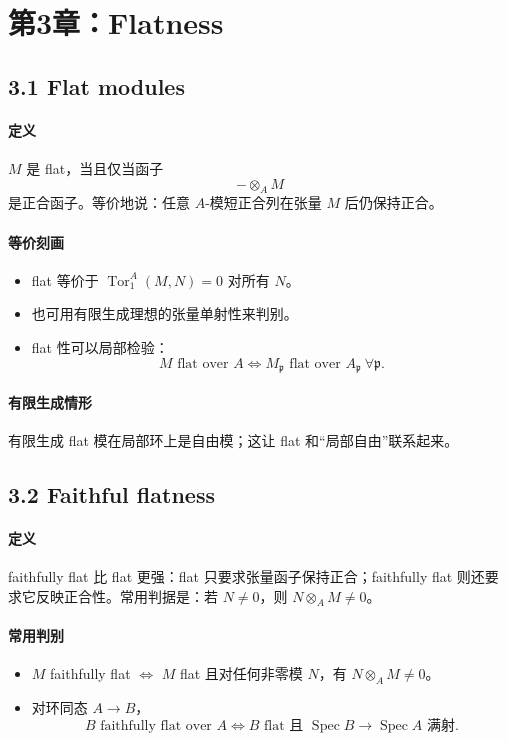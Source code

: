 \documentclass[a4paper]{ctexart}
\begin{document}
\section{第3章：Flatness}

\subsection{3.1 Flat modules}

\paragraph{定义}
\(M\) 是 flat，当且仅当函子
\[
-\otimes_A M
\]
是正合函子。等价地说：任意 \(A\)-模短正合列在张量 \(M\) 后仍保持正合。

\paragraph{等价刻画}
\begin{itemize}
  \item flat 等价于 \(\operatorname{Tor}_1^A(M,N)=0\) 对所有 \(N\)。
  \item 也可用有限生成理想的张量单射性来判别。
  \item flat 性可以局部检验：
  \[
    M \text{ flat over } A
    \Longleftrightarrow
    M_{\mathfrak p} \text{ flat over } A_{\mathfrak p}\ \forall \mathfrak p.
  \]
\end{itemize}

\paragraph{有限生成情形}
有限生成 flat 模在局部环上是自由模；这让 flat 和“局部自由”联系起来。

\subsection{3.2 Faithful flatness}

\paragraph{定义}
faithfully flat 比 flat 更强：flat 只要求张量函子保持正合；faithfully flat 则还要求它反映正合性。常用判据是：若 \(N\neq 0\)，则 \(N\otimes_A M\neq 0\)。

\paragraph{常用判别}
\begin{itemize}
  \item \(M\) faithfully flat
  \(\Longleftrightarrow\)
  \(M\) flat 且对任何非零模 \(N\)，有 \(N\otimes_A M\neq 0\)。
  \item 对环同态 \(A\to B\)，
  \[
    B \text{ faithfully flat over } A
    \Longleftrightarrow
    B \text{ flat 且 } \operatorname{Spec}B\to \operatorname{Spec}A \text{ 满射}.
  \]
\end{itemize}
\end{document}
